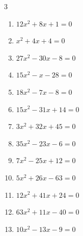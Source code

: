 \begin{multicols}{3}
\begin{enumerate}
  \item $12x^{2}+8x+1=0$


  \item $x^{2}+4x+4=0$

        \phantom{$\displaystyle x=-2$}

  \item $27x^{2}-30x-8=0$


  \item $15x^{2}-x-28=0$


  \item $18x^{2}-7x-8=0$


  \item $15x^{2}-31x+14=0$


\columnbreak %

  \item $3x^{2}+32x+45=0$


  \item $35x^{2}-23x-6=0$


  \item $7x^{2}-25x+12=0$


  \item $5x^{2}+26x-63=0$


  \item $12x^{2}+41x+24=0$


  \item $63x^{2}+11x-40=0$


  \item $10x^{2}-13x-9=0$


\end{enumerate}
\end{multicols}
